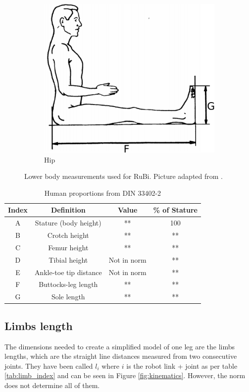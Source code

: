 \begin{figure}[htb]
\begin{subfigure}[b]{0.4\textwidth}
        \includegraphics[width=\textwidth]{figures/din_measurements2.pdf}
        \caption{Hip}
        \label{fig:din2}
    \end{subfigure}
	\caption{Lower body measurements used for RuBi. Picture adapted from \cite{din_measurements1}.}
	\label{fig:human_measurements}
\end{figure}


\begin{table}
\begin{center}
	\begin{tabular}{c | c | c | c}
	  Index & Definition & Value & \% of Stature \\
	  \hline
	  A & Stature (body height) & ** & 100 \\
	  B & Crotch height & ** & ** \\
	  C & Femur height & ** & ** \\
	  D & Tibial height & Not in norm & **\\
	  E & Ankle-toe tip distance & Not in norm & ** \\
	  F & Buttocks-leg length & ** & ** \\
	  G & Sole length & ** & **
	\end{tabular}
	\caption{Human proportions from DIN 33402-2}
	\label{tab:din_proportions}
\end{center}
\end{table}

\subsection{Limbs length} %
\label{sub:limbs_lengths}
The dimensions needed to create a simplified model of one leg are the limbs lengths, which are the straight line distances measured from two consecutive joints.
They have been called $l_{i}$ where $i$ is the robot link + joint as per table \ref{tab:limb_index} and can be seen in Figure \ref{fig:kinematics}.
However, the norm does not determine all of them.

